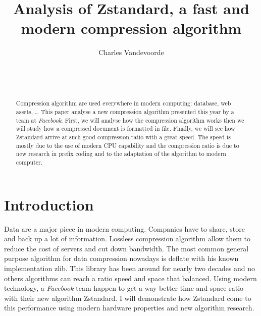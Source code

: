 \documentclass{sig-alternate-05-2015}
\begin{document}
\toappear

\title{Analysis of Zstandard, a fast and modern compression algorithm}

\author{
\alignauthor
Charles Vandevoorde\\
       \\
       \\
       \\
}

\maketitle

\begin{abstract}
    Compression algorithm are used everywhere in modern computing: database, web assets, \ldots
    This paper analyse a new compression algorithm presented this year by a team at
    \textit{Facebook}. First, we will analyse how the compression algorithm works then we will study
    how a compressed document is formatted in file. Finally, we will see how Zstandard arrive at
    such good compression ratio with a great speed. The speed is mostly due to the use of modern
    CPU capability and the compression ratio is due to new research in prefix coding and to the
    adaptation of the algorithm to modern computer.

\end{abstract}


\section{Introduction}
    Data are a major piece in modern computing. Companies have to share, store and back up a
    lot of information. Lossless compression algorithm allow them to reduce the cost of servers and
    cut down bandwidth. The most common general purpose algorithm for data compression nowadays is
    deflate with his known implementation zlib.  This library has been around for nearly two decades
    and no others algorithms can reach a ratio speed and space that balanced. Using modern
    technology, a \textit{Facebook} team happen to get a way better time and space ratio with their
    new algorithm Zstandard. I will demonstrate how Zstandard come to this performance using modern
    hardware properties and new algorithm research.
\end{document}
